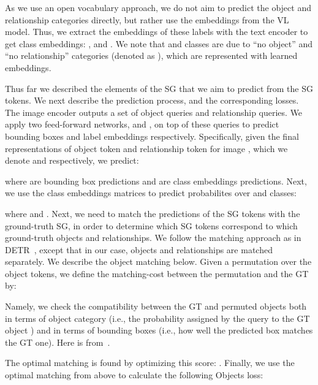 \documentclass[11pt]{article}
\begin{document}
As we use an open vocabulary approach, we do not aim to predict the object and relationship categories directly, but rather use the embeddings from the VL model. Thus, we extract the embeddings of these labels with the text encoder  to get class embeddings:  , and . We note that  and  classes are due to ``no object'' and ``no relationship'' categories (denoted as ), which are represented with learned embeddings.
















Thus far we described the elements of the SG that we aim to predict from the SG tokens. We next describe the prediction process, and the corresponding losses. The image encoder outputs a set of  object queries and  relationship queries. We apply two feed-forward networks,  and , on top of these queries to predict bounding boxes and label embeddings respectively. Specifically, given the final representations of  object token and  relationship token for image , which we denote  and  respectively, we predict:  


where  are bounding box predictions and  are class embeddings predictions. Next, we use the class embeddings matrices to predict probabilites over  and  classes:


where  and . Next, we need to match the predictions of the SG tokens with the ground-truth SG, in order to determine which SG tokens correspond to which ground-truth objects and relationships. We follow the matching approach as in DETR~\cite{detr2020}, except that in our case, objects and relationships are matched separately. We describe the object matching below.
Given a permutation  over the object tokens, we define the matching-cost between the permutation and the GT by:

\small

\normalsize


Namely, we check the compatibility between the GT and permuted objects both in terms of object category (i.e., the probability assigned by the query to the GT object ) and in terms of bounding boxes (i.e., how well the predicted box matches the GT one). Here  is from~\cite{giou_2018_CVPR}. 

The optimal matching  is found by optimizing this score: . Finally, we use the optimal matching  from above to calculate the following Objects loss:
\end{document}
